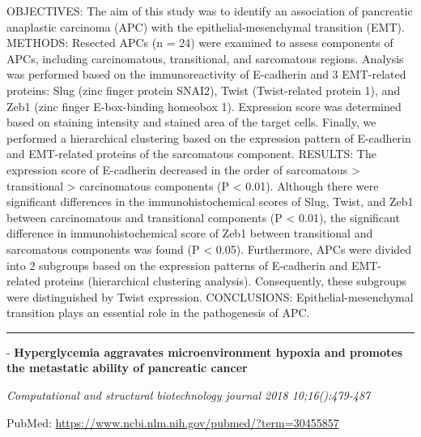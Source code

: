 \documentclass[]{article}
\begin{document}
OBJECTIVES: The aim of this study was to identify an association of
pancreatic anaplastic carcinoma (APC) with the epithelial-mesenchymal
transition (EMT). METHODS: Resected APCs (n = 24) were examined to
assess components of APCs, including carcinomatous, transitional, and
sarcomatous regions. Analysis was performed based on the
immunoreactivity of E-cadherin and 3 EMT-related proteins: Slug (zinc
finger protein SNAI2), Twist (Twist-related protein 1), and Zeb1 (zinc
finger E-box-binding homeobox 1). Expression score was determined based
on staining intensity and stained area of the target cells. Finally, we
performed a hierarchical clustering based on the expression pattern of
E-cadherin and EMT-related proteins of the sarcomatous component.
RESULTS: The expression score of E-cadherin decreased in the order of
sarcomatous \textgreater{} transitional \textgreater{} carcinomatous
components (P \textless{} 0.01). Although there were significant
differences in the immunohistochemical scores of Slug, Twist, and Zeb1
between carcinomatous and transitional components (P \textless{} 0.01),
the significant difference in immunohistochemical score of Zeb1 between
transitional and sarcomatous components was found (P \textless{} 0.05).
Furthermore, APCs were divided into 2 subgroups based on the expression
patterns of E-cadherin and EMT-related proteins (hierarchical clustering
analysis). Consequently, these subgroups were distinguished by Twist
expression. CONCLUSIONS: Epithelial-mesenchymal transition plays an
essential role in the pathogenesis of APC.

{}

{}

\begin{center}\rule{0.5\linewidth}{\linethickness}\end{center}

 - \textbf{Hyperglycemia aggravates microenvironment hypoxia and
promotes the metastatic ability of pancreatic cancer}

\emph{Computational and structural biotechnology journal 2018
10;16():479-487}

PubMed: \url{https://www.ncbi.nlm.nih.gov/pubmed/?term=30455857}
\end{document}
